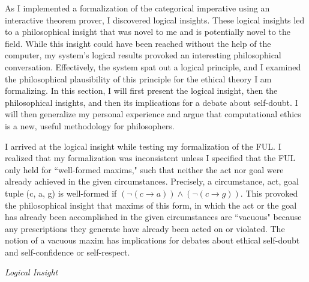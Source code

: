 \begin{isabellebody}
%
\isadelimdocument
%
\endisadelimdocument
%
\isatagdocument
%
\isamarkuptrue%
%
\endisatagdocument
{\isafolddocument}%
%
\isadelimdocument
%
\endisadelimdocument
%
\begin{isamarkuptext}%
As I implemented a formalization of the categorical imperative using an interactive theorem prover, 
I discovered logical insights. These logical insights led to a philosophical 
insight that was novel to me and is potentially novel to the field.  While this 
insight could have been reached without the help of the computer, my system's logical results provoked
an interesting philosophical conversation. Effectively, the system spat out a logical principle, and 
I examined the philosophical plausibility of this principle for the ethical 
theory I am formalizing. In this section, I will first present the logical insight, then the 
philosophical insights, and then its implications for a debate about self-doubt. I will then
generalize my personal experience and argue that computational ethics is a new, useful methodology 
for philosophers.

I arrived at the logical insight while testing my formalization of the FUL. I realized
that my formalization was inconsistent unless I specified that the FUL only held for ``well-formed maxims,"
such that neither the act nor goal were already achieved in the given circumstances. Precisely, 
a circumstance, act, goal tuple (c, a, g) is well-formed if $(\neg (c \longrightarrow a) ) \wedge 
(\neg(c \longrightarrow g))$. This provoked the philosophical insight that maxims of this form, in which 
the act or the goal has already been accomplished in the given circumstances are ``vacuous" because 
any prescriptions they generate have already been acted on or violated. The notion of a vacuous maxim
has implications for debates about ethical self-doubt and self-confidence or self-respect.

\emph{Logical Insight}


\end{isamarkuptext}
\end{isabellebody}
